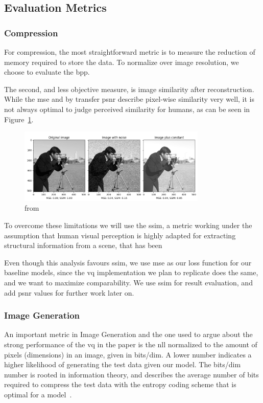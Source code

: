 \subsection{Evaluation Metrics}\label{subsec:evaluation-metrics}
\subsubsection{Compression}
For compression, the most straightforward metric is to measure the reduction of memory required to
store the data.
To normalize over image resolution, we choose to evaluate the \ac{bpp}.

The second, and less objective measure, is image similarity after reconstruction.
While the \ac{mse} and by transfer \ac{psnr} describe pixel-wise similarity very well, it is not
always optimal to judge perceived similarity for humans, as can be seen in Figure~\ref{fig:mse_ssim}.

\begin{figure}[h]
    \centering
    \includegraphics[width=0.8\textwidth]{images/ssim_mse}
    \caption{from~\cite{scikit-ssim}}
    \label{fig:mse_ssim}
\end{figure}

To overcome these limitations we will use the \ac{ssim}, a metric working under the assumption that human visual
perception is highly adapted for extracting structural information from a scene, that has been

Even though this analysis favours \ac{ssim}, we use \ac{mse} as our loss function for our baseline models,
since the \ac{vq} implementation we plan to replicate does the same, and we want to maximize comparability.
We use \ac{ssim} for result evaluation, and add \ac{psnr} values for further work later on.


\subsubsection{Image Generation}
An important metric in Image Generation and the one used to argue about the strong performance of the \ac{vq} in the
paper is the \ac{nll} normalized to the amount of pixels (dimensions) in an image, given in bits/dim.
A lower number indicates a higher likelihood of generating the test data given our model.
The bits/dim number is rooted in information theory, and describes the average number of bits required to
compress the test data with the entropy coding scheme that is optimal for a model~\cite{shannon}.

